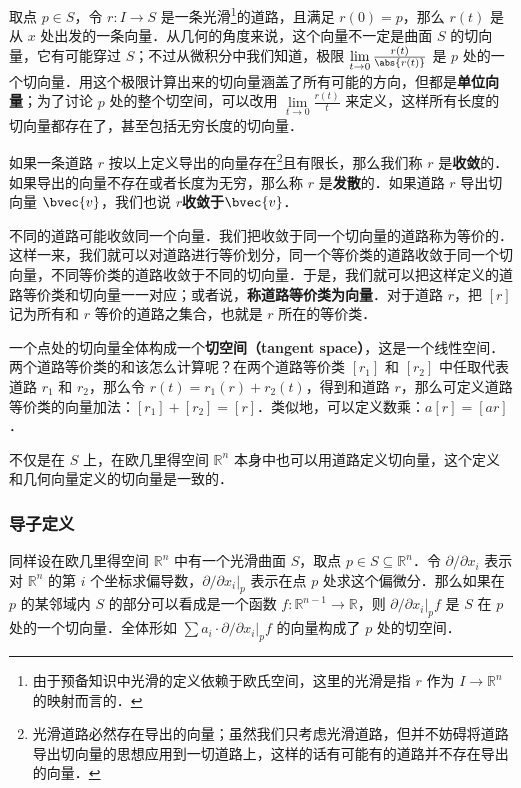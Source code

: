 取点 $p\in S$，令 $r:I\rightarrow S$ 是一条光滑\footnote{由于预备知识中光滑的定义依赖于欧氏空间，这里的光滑是指 $r$ 作为 $I\rightarrow\mathbb{R}^n$ 的映射而言的．}的道路，且满足 $r(0)=p$，那么 $r(t)$ 是从 $x$ 处出发的一条向量．从几何的角度来说，这个向量不一定是曲面 $S$ 的切向量，它有可能穿过 $S$；不过从微积分中我们知道，极限 $\lim\limits_{t\rightarrow 0}\frac{r(t)}{\abs{r(t)}}$ 是 $p$ 处的一个切向量．用这个极限计算出来的切向量涵盖了所有可能的方向，但都是\textbf{单位向量}；为了讨论 $p$ 处的整个切空间，可以改用 $\lim\limits_{t\rightarrow 0}\frac{r(t)}{t}$ 来定义，这样所有长度的切向量都存在了，甚至包括无穷长度的切向量．

如果一条道路 $r$ 按以上定义导出的向量存在\footnote{光滑道路必然存在导出的向量；虽然我们只考虑光滑道路，但并不妨碍将道路导出切向量的思想应用到一切道路上，这样的话有可能有的道路并不存在导出的向量．}且有限长，那么我们称 $r$ 是\textbf{收敛}的．如果导出的向量不存在或者长度为无穷，那么称 $r$ 是\textbf{发散}的．如果道路 $r$ 导出切向量 $\bvec{v}$，我们也说 $r$\textbf{收敛于}$\bvec{v}$．

不同的道路可能收敛同一个向量．我们把收敛于同一个切向量的道路称为等价的．这样一来，我们就可以对道路进行等价划分，同一个等价类的道路收敛于同一个切向量，不同等价类的道路收敛于不同的切向量．于是，我们就可以把这样定义的道路等价类和切向量一一对应；或者说，\textbf{称道路等价类为向量}．对于道路 $r$，把 $[r]$ 记为所有和 $r$ 等价的道路之集合，也就是 $r$ 所在的等价类．

一个点处的切向量全体构成一个\textbf{切空间（tangent space）}，这是一个线性空间．两个道路等价类的和该怎么计算呢？在两个道路等价类 $[r_1]$ 和 $[r_2]$ 中任取代表道路 $r_1$ 和 $r_2$，那么令 $r(t)=r_1(r)+r_2(t)$，得到和道路 $r$，那么可定义道路等价类的向量加法：$[r_1]+[r_2]=[r]$．类似地，可以定义数乘：$a[r]=[ar]$．

不仅是在 $S$ 上，在欧几里得空间 $\mathbb{R}^n$ 本身中也可以用道路定义切向量，这个定义和几何向量定义的切向量是一致的．

\subsubsection{导子定义}

同样设在欧几里得空间 $\mathbb{R}^n$ 中有一个光滑曲面 $S$，取点 $p\in S\subseteq\mathbb{R}^n$．令 $\partial/\partial x_i$ 表示对 $\mathbb{R}^n$ 的第 $i$ 个坐标求偏导数，$\partial/\partial x_i|_{p}$ 表示在点 $p$ 处求这个偏微分．那么如果在 $p$ 的某邻域内 $S$ 的部分可以看成是一个函数 $f:\mathbb{R}^{n-1}\rightarrow\mathbb{R}$，则 $\partial/\partial x_i|_{p}f$ 是 $S$ 在 $p$ 处的一个切向量．全体形如 $\sum a_i\cdot\partial/\partial x_i|_{p}f$ 的向量构成了 $p$ 处的切空间．

